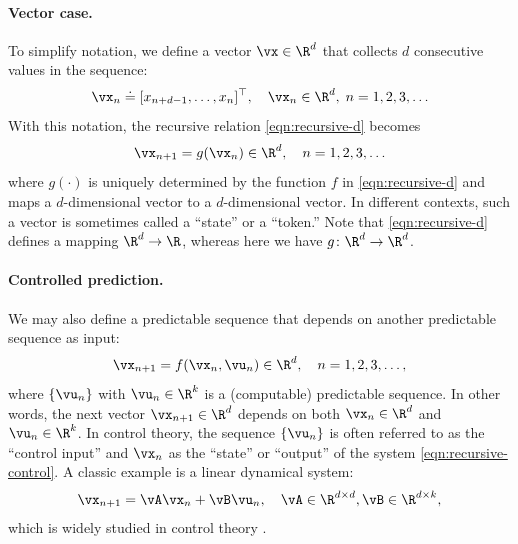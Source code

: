 \documentclass[../../book-main.tex]{subfiles}
\begin{document}
\paragraph{Vector case.}
To simplify notation, we define a vector \(\vx \in \R^{d}\) that
collects \(d\) consecutive values in the sequence:
\begin{equation}
    \vx_{n} \doteq [x_{n+d-1}, \ldots, x_{n}]^{\top}, \quad \vx_{n}
    \in \R^{d}, \; n = 1, 2, 3, \ldots
\end{equation}
With this notation, the recursive relation \eqref{eqn:recursive-d} becomes
\begin{equation}
    \vx_{n+1} = g(\vx_{n}) \in \R^{d}, \quad n = 1, 2, 3, \ldots
    \label{eqn:recursive-v}
\end{equation}
where \(g(\cdot)\) is uniquely determined by the function \(f\) in
\eqref{eqn:recursive-d} and maps a \(d\)-dimensional vector to a
\(d\)-dimensional vector. In different contexts, such a vector is
sometimes called a ``state'' or a ``token.'' Note that
\eqref{eqn:recursive-d} defines a mapping \(\R^{d} \to \R\), whereas
here we have \(g \colon \R^{d} \to \R^{d}\).

\paragraph{Controlled prediction.}
We may also define a predictable sequence that depends on another
predictable sequence as input:
\begin{equation}
    \vx_{n+1} = f(\vx_{n}, \vu_{n}) \in \R^{d}, \quad n = 1, 2, 3, \ldots,
    \label{eqn:recursive-control}
\end{equation}
where \(\{\vu_{n}\}\) with \(\vu_{n} \in \R^{k}\) is a (computable)
predictable sequence. In other words, the next vector \(\vx_{n+1} \in
\R^{d}\) depends on both \(\vx_{n} \in \R^{d}\) and \(\vu_{n} \in
\R^{k}\). In control theory, the sequence \(\{\vu_{n}\}\) is often
referred to as the ``control input'' and \(\vx_{n}\) as the ``state''
or ``output'' of the system \eqref{eqn:recursive-control}. A classic
example is a linear dynamical system:
\begin{equation}
    \vx_{n+1} = \vA\vx_{n} + \vB\vu_{n}, \quad \vA \in \R^{d \times
    d}, \vB \in \R^{d \times k},
    \label{eqn:lineary-system}
\end{equation}
which is widely studied in control theory \cite{Cal:Des}.
\end{document}
